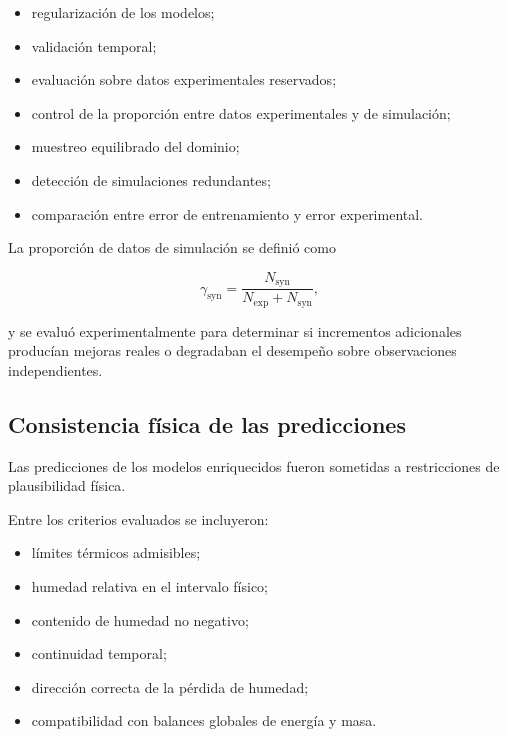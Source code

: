 \begin{itemize}
    \item regularización de los modelos;
    \item validación temporal;
    \item evaluación sobre datos experimentales reservados;
    \item control de la proporción entre datos experimentales y de simulación;
    \item muestreo equilibrado del dominio;
    \item detección de simulaciones redundantes;
    \item comparación entre error de entrenamiento y error experimental.
\end{itemize}

La proporción de datos de simulación se definió como

\begin{equation}
\gamma_{\mathrm{syn}}
=
\frac{N_{\mathrm{syn}}}
{N_{\mathrm{exp}}+N_{\mathrm{syn}}},
\label{eq:proporcion_simulaciones}
\end{equation}

y se evaluó experimentalmente para determinar si incrementos adicionales producían mejoras reales o degradaban el desempeño sobre observaciones independientes.

\subsection{Consistencia física de las predicciones}
\label{subsec:consistencia_fisica_predictions}

Las predicciones de los modelos enriquecidos fueron sometidas a restricciones de plausibilidad física.

Entre los criterios evaluados se incluyeron:

\begin{itemize}
    \item límites térmicos admisibles;
    \item humedad relativa en el intervalo físico;
    \item contenido de humedad no negativo;
    \item continuidad temporal;
    \item dirección correcta de la pérdida de humedad;
    \item compatibilidad con balances globales de energía y masa.
\end{itemize}

